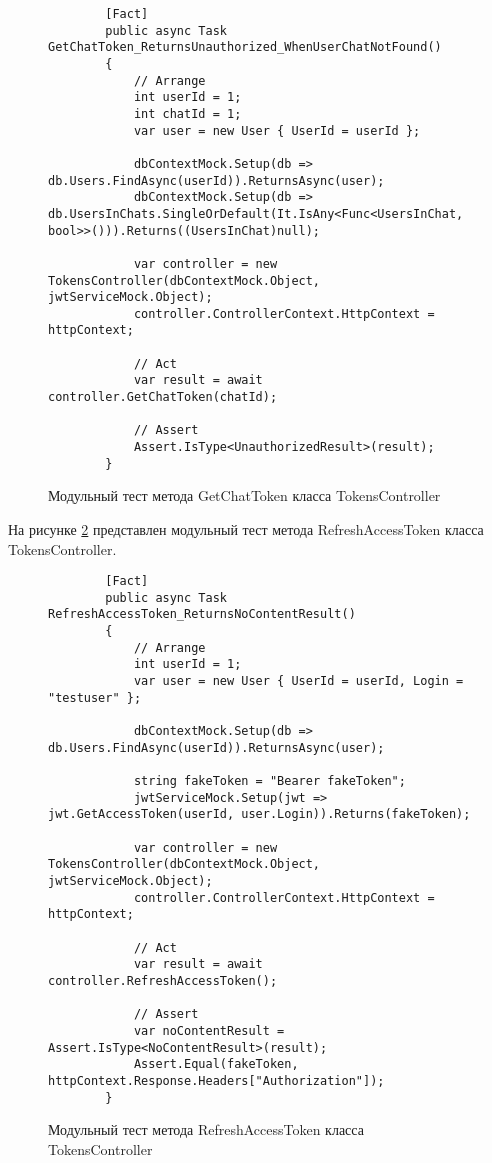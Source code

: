 \begin{figure}[H]
	\begin{lstlisting}
		[Fact]
		public async Task GetChatToken_ReturnsUnauthorized_WhenUserChatNotFound()
		{
			// Arrange
			int userId = 1;
			int chatId = 1;
			var user = new User { UserId = userId };
			
			dbContextMock.Setup(db => db.Users.FindAsync(userId)).ReturnsAsync(user);
			dbContextMock.Setup(db => db.UsersInChats.SingleOrDefault(It.IsAny<Func<UsersInChat, bool>>())).Returns((UsersInChat)null);
			
			var controller = new TokensController(dbContextMock.Object, jwtServiceMock.Object);
			controller.ControllerContext.HttpContext = httpContext;
			
			// Act
			var result = await controller.GetChatToken(chatId);
			
			// Assert
			Assert.IsType<UnauthorizedResult>(result);
		}
	\end{lstlisting}
	\caption{Модульный тест метода GetChatToken класса TokensController}
	\label{unitGetChatToken:image}
\end{figure}

На рисунке \ref{unitRefreshAccessToken:image} представлен модульный тест метода RefreshAccessToken класса TokensController.

\begin{figure}[H]
	\begin{lstlisting}
		[Fact]
		public async Task RefreshAccessToken_ReturnsNoContentResult()
		{
			// Arrange
			int userId = 1;
			var user = new User { UserId = userId, Login = "testuser" };
			
			dbContextMock.Setup(db => db.Users.FindAsync(userId)).ReturnsAsync(user);
			
			string fakeToken = "Bearer fakeToken";
			jwtServiceMock.Setup(jwt => jwt.GetAccessToken(userId, user.Login)).Returns(fakeToken);
			
			var controller = new TokensController(dbContextMock.Object, jwtServiceMock.Object);
			controller.ControllerContext.HttpContext = httpContext;
			
			// Act
			var result = await controller.RefreshAccessToken();
			
			// Assert
			var noContentResult = Assert.IsType<NoContentResult>(result);
			Assert.Equal(fakeToken, httpContext.Response.Headers["Authorization"]);
		}
	\end{lstlisting}
	\caption{Модульный тест метода RefreshAccessToken класса TokensController}
	\label{unitRefreshAccessToken:image}
\end{figure}

